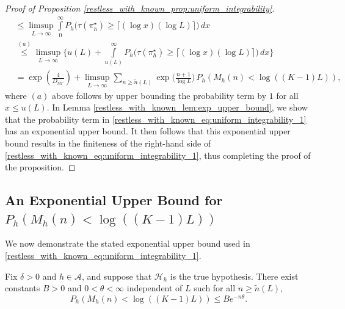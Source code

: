 \begin{proof}[Proof of Proposition \ref{restless_with_known_prop:uniform_integrability}]
\begin{align}
	&\leq \limsup\limits_{L\to\infty}\int\limits_{0}^{\infty}P_h\bigg({\tau(\pi^\star_h)}\geq \lceil(\log x)({\log L})\rceil\bigg)\,dx\nonumber\\
	&\stackrel{(a)}{\leq} \limsup\limits_{L\to\infty}\bigg\lbrace u(L)+\int\limits_{u(L)}^{\infty}P_h\bigg({\tau(\pi^\star_h)}\geq \lceil(\log x)({\log L})\rceil\bigg)\,dx\bigg\rbrace\nonumber\\
	&= \exp\left(\frac{4}{D_{hh'}}\right)+\limsup\limits_{L\to\infty}\sum\limits_{n\geq \tilde{n}(L)}\exp\bigg(\frac{n+1}{\log L}\bigg)\,P_h(M_h(n)<\log((K-1)L)),\label{restless_with_known_eq:uniform_integrability_1}
\end{align}\endgroup
where $(a)$ above follows by upper bounding the probability term by $1$ for all $x\leq u(L)$. In Lemma \ref{restless_with_known_lem:exp_upper_bound}, we show that the probability term in \eqref{restless_with_known_eq:uniform_integrability_1} has an exponential upper bound. It then follows that this exponential upper bound results in the finiteness of the right-hand side of \eqref{restless_with_known_eq:uniform_integrability_1}, thus completing the proof of the proposition. 
\end{proof}

\subsection{An Exponential Upper Bound for $P_h(M_h(n)<\log((K-1)L))$} \label{restless_with_known_appndx:exp_upper_bound_for_a_certain_term}
We now demonstrate the stated exponential upper bound used in \eqref{restless_with_known_eq:uniform_integrability_1}.

\begin{lemma}\label{restless_with_known_lem:exp_upper_bound}
	Fix $\delta>0$ and $h\in\mathcal{A}$, and suppose that $\mathcal{H}_h$ is the true hypothesis. There exist constants $B>0$ and $0<\theta<\infty$ independent of $L$ such for all $n\geq \tilde{n}(L)$, 
	\begin{equation}
		P_h(M_h(n)<\log((K-1)L))\leq Be^{-n\theta}.\label{restless_with_known_eq:exp_upper_bound} 
	\end{equation}
\end{lemma}

